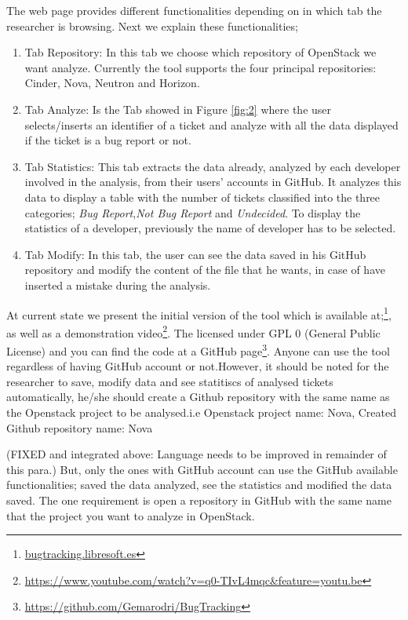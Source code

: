 \documentclass[runningheads,a4paper]{llncs}
\begin{document}
The web page provides different functionalities depending on in which tab the researcher is browsing. Next we explain these functionalities;
\begin{enumerate}
  \item Tab Repository: In this tab we choose which repository of OpenStack we want analyze. Currently the tool supports the four principal repositories: Cinder, Nova, Neutron and Horizon.
  \item Tab Analyze: Is the Tab showed in Figure \ref{fig:2} where the user selects/inserts an identifier of a ticket and analyze with all the data displayed if the ticket is a bug report or not.
  \item Tab Statistics: This tab extracts the data already, analyzed by each developer involved in the analysis, from their users' accounts in GitHub. It analyzes this data to display a table with the number of tickets classified into the three categories; \textit{Bug Report},\textit{Not Bug Report} and \textit{Undecided}. To display the statistics of a developer, previously the name of developer has to be selected.
  \item Tab Modify: In this tab, the user can see the data saved in his GitHub repository and modify the content of the file that he wants, in case of have inserted a mistake during the analysis.
\end{enumerate}

At current state we present the initial version of the tool which is available at;\footnote{\url{bugtracking.libresoft.es}}, as well as a demonstration video\footnote{\url{https://www.youtube.com/watch?v=q0-TIvL4mqc&feature=youtu.be}}. The licensed under GPL 0 (General Public License) and you can find the code at a GitHub page\footnote{\url{https://github.com/Gemarodri/BugTracking}}. Anyone can use the tool regardless of having GitHub account or not.However, it should be noted for the researcher to save, modify data and see statitiscs of analysed tickets automatically, he/she should create a Github repository with the same name as the Openstack project to be analysed.i.e Openstack project name: Nova, Created Github repository name: Nova 

(FIXED and integrated above: Language needs to be improved in remainder of this para.) But, only the ones with GitHub account can use the GitHub available functionalities; saved the data analyzed, see the statistics and modified the data saved. The one requirement is open a repository in GitHub with the same name that the project you want to analyze in OpenStack.
\end{document}
